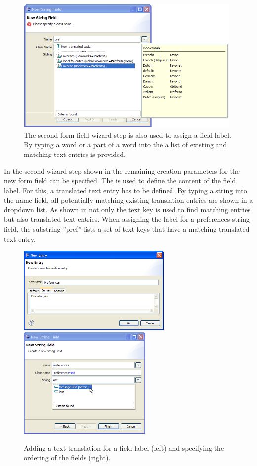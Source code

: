 \documentclass[a4paper,10pt,twoside]{book}
\begin{document}
\begin{figure}
\includegraphics[width=11cm]{wizard_field_2.png}
\caption{The second form field wizard step is also used to assign a field label. 
By typing a word or a part of a word into the  a list of existing and matching text entries is provided.}
\end{figure}

In the second wizard step shown in  the remaining creation parameters for the new form field can be specified. 
The  is used to define the content of the field label. 
For this, a translated text entry has to be defined. 
By typing a string into the name field, all potentially matching existing translation entries are shown in a dropdown list. 
As shown in  not only the text key is used to find matching entries but also translated text entries. 
When assigning the label for a preferences string field, the substring ''pref'' lists a set of text keys that have a matching translated text entry. 

\begin{figure}
\includegraphics[width=7.5cm]{wizard_field_translation.png} \hspace{5mm}
\includegraphics[width=6.5cm]{wizard_field_3.png}
\caption{Adding a text translation for a field label (left) and specifying the ordering of the fields (right).}
\end{figure}
\end{document}
